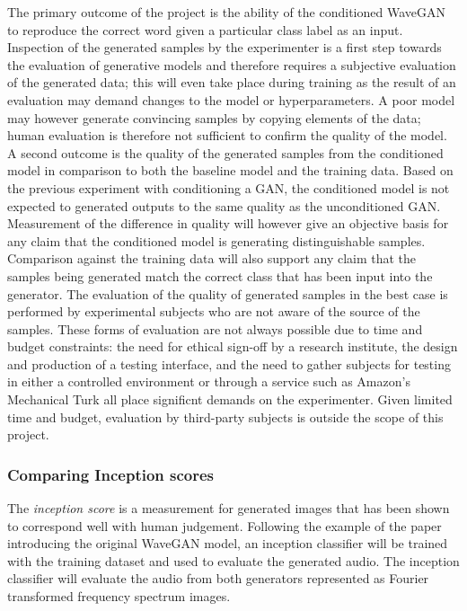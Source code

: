 \documentclass[a4paper, dvipsnames, titlepage]{article}
\begin{document}
The primary outcome of the project is the ability of the conditioned WaveGAN to reproduce the correct word given a particular class label as an input.
Inspection of the generated samples by the experimenter is a first step towards the evaluation of generative models and therefore requires a subjective evaluation of the generated data; this will even take place during training as the result of an evaluation may demand changes to the model or hyperparameters.
A poor model may however generate convincing samples by copying elements of the data; human evaluation is therefore not sufficient to confirm the quality of the model.
\newline
\newline
A second outcome is the quality of the generated samples from the conditioned model in comparison to both the baseline model and the training data.
Based on the previous experiment with conditioning a GAN, the conditioned model is not expected to generated outputs to the same quality as the unconditioned GAN.
Measurement of the difference in quality will however give an objective basis for any claim that the conditioned model is generating distinguishable samples.
Comparison against the training data will also support any claim that the samples being generated match the correct class that has been input into the generator.
\newline
\newline
The evaluation of the quality of generated samples in the best case is performed by experimental subjects who are not aware of the source of the samples.
These forms of evaluation are not always possible due to time and budget constraints: the need for ethical sign-off by a research institute, the design and production of a testing interface, and the need to gather subjects for testing in either a controlled environment or through a service such as Amazon's Mechanical Turk all place significnt demands on the experimenter.
Given limited time and budget, evaluation by third-party subjects is outside the scope of this project.

\subsubsection{Comparing Inception scores}

The \textit{inception score} is a measurement for generated images that has been shown to correspond well with human judgement.
Following the example of the paper introducing the original WaveGAN model, an inception classifier will be trained with the training dataset and used to evaluate the generated audio.
The inception classifier will evaluate the audio from both generators represented as Fourier transformed frequency spectrum images.
\end{document}
